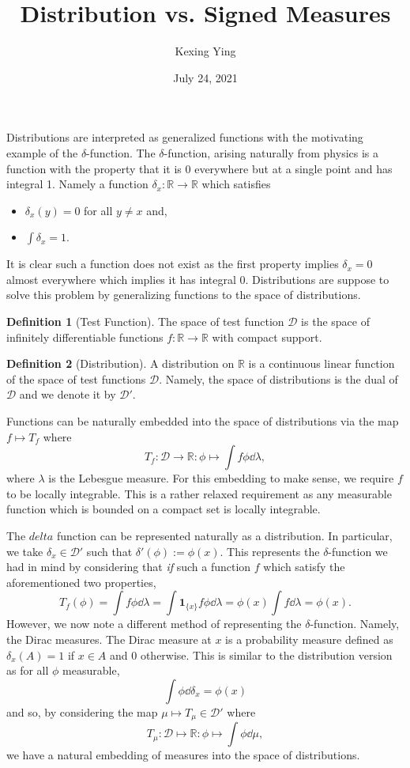 \documentclass[]{article}
\title{Distribution vs. Signed Measures}
\author{Kexing Ying}
\date{July 24, 2021}
\theoremstyle{definition}
\theoremstyle{definition}
\newtheorem{definition}{Definition}
\begin{document}
\maketitle

Distributions are interpreted as generalized functions with the motivating example 
of the \(\delta\)-function. The \(\delta\)-function, arising naturally from physics 
is a function with the property that it is 0 everywhere but at a single point 
and has integral 1. Namely a function
\(\delta_x : \mathbb{R} \to \mathbb{R}\) which satisfies 
\begin{itemize}
  \item \(\delta_x(y) = 0\) for all \(y \neq x\) and, 
  \item \(\int \delta_x = 1\). 
\end{itemize}
It is clear such a function does not exist as the first property implies 
\(\delta_x = 0\) almost everywhere which implies it has integral 0. Distributions 
are suppose to solve this problem by generalizing functions to the space of 
distributions.

\begin{definition}[Test Function]
  The space of test function \(\mathcal{D}\) is the space of infinitely 
  differentiable functions \(f : \mathbb{R} \to \mathbb{R}\) with compact support.
\end{definition}

\begin{definition}[Distribution]
  A distribution on \(\mathbb{R}\) is a continuous linear function of the space 
  of test functions \(\mathcal{D}\). Namely, the space of distributions is the 
  dual of \(\mathcal{D}\) and we denote it by \(\mathcal{D}'\). 
\end{definition}

Functions can be naturally embedded into the space of distributions via the map 
\(f \mapsto T_f\) where 
\[T_f : \mathcal{D} \to \mathbb{R} : \phi \mapsto \int f \phi \dd \lambda,\]
where \(\lambda\) is the Lebesgue measure. For this embedding to make sense, 
we require \(f\) to be locally integrable. This is a rather relaxed requirement 
as any measurable function which is bounded on a compact set is locally integrable. 

The \(delta\) function can be represented naturally as a distribution. 
In particular, we take \(\delta_x \in \mathcal{D}'\) such that 
\(\delta'(\phi) := \phi(x)\). This represents the \(\delta\)-function we had 
in mind by considering that \textit{if} such a function \(f\) which satisfy 
the aforementioned two properties, 
\[T_f(\phi) = \int f \phi \dd \lambda = 
  \int \mathbf{1}_{\{x\}}f \phi \dd \lambda = \phi(x)\int f \dd \lambda = \phi(x).\]
However, we now note a different method of representing the \(\delta\)-function. 
Namely, the Dirac measures. The Dirac measure at \(x\) is a probability measure 
defined as \(\delta_x(A) = 1\) if \(x \in A\) and 0 otherwise. This is similar 
to the distribution version as for all \(\phi\) measurable, 
\[\int \phi \dd \delta_x = \phi(x)\]
and so, by considering the map \(\mu \mapsto T_\mu \in \mathcal{D}'\) where 
\[T_\mu : \mathcal{D} \mapsto \mathbb{R} : \phi \mapsto \int \phi \dd \mu,\]
we have a natural embedding of measures into the space of distributions.
\end{document}
